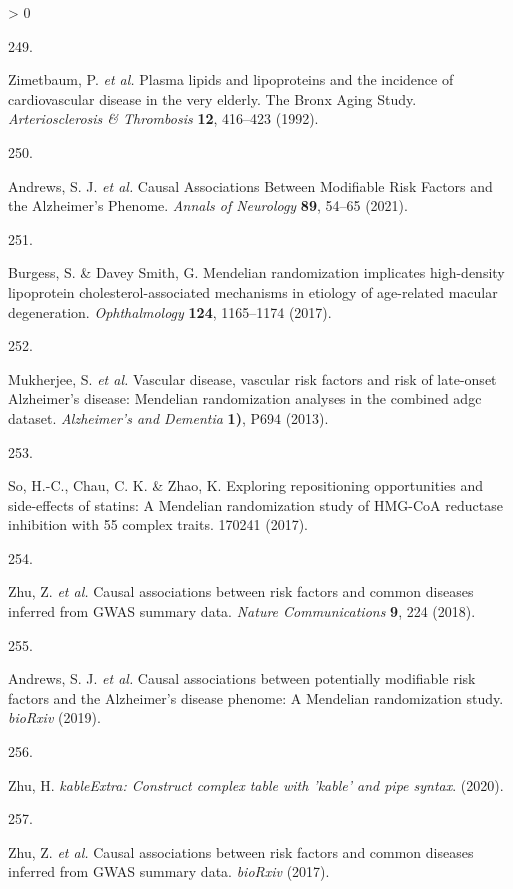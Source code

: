 \documentclass[a4paper, twoside]{templates/ociamthesis}
\newlength{\cslhangindent}
\newlength{\csllabelwidth}
\newenvironment{CSLReferences}[3] %
 {%
  \setlength{\parindent}{0pt}
  \ifodd #1 \everypar{\setlength{\hangindent}{\cslhangindent}}\ignorespaces\fi
  \ifnum #2 > 0
  \setlength{\parskip}{#2\baselineskip}
  \fi
 }%
 {}
\newcommand{\CSLLeftMargin}[1]{\parbox[t]{\maxof{\widthof{#1}}{\csllabelwidth}}{#1}}
\newcommand{\CSLRightInline}[1]{\parbox[t]{\linewidth - \csllabelwidth}{#1}}
\begin{document}
\begin{CSLReferences}{0}{0}
\leavevmode\hypertarget{ref-zimetbaum1992}{}%
\CSLLeftMargin{249. }
\CSLRightInline{Zimetbaum, P. \emph{et al.} Plasma lipids and lipoproteins and the incidence of cardiovascular disease in the very elderly. {The Bronx Aging Study}. \emph{Arteriosclerosis \& Thrombosis} \textbf{12}, 416--423 (1992).}

\leavevmode\hypertarget{ref-andrews2021}{}%
\CSLLeftMargin{250. }
\CSLRightInline{Andrews, S. J. \emph{et al.} Causal {Associations Between Modifiable Risk Factors} and the {Alzheimer}'s {Phenome}. \emph{Annals of Neurology} \textbf{89}, 54--65 (2021).}

\leavevmode\hypertarget{ref-burgess2017}{}%
\CSLLeftMargin{251. }
\CSLRightInline{Burgess, S. \& Davey Smith, G. Mendelian randomization implicates high-density lipoprotein cholesterol-associated mechanisms in etiology of age-related macular degeneration. \emph{Ophthalmology} \textbf{124}, 1165--1174 (2017).}

\leavevmode\hypertarget{ref-mukherjee2013}{}%
\CSLLeftMargin{252. }
\CSLRightInline{Mukherjee, S. \emph{et al.} Vascular disease, vascular risk factors and risk of late-onset {Alzheimer}'s disease: Mendelian randomization analyses in the combined adgc dataset. \emph{Alzheimer's and Dementia} \textbf{1)}, P694 (2013).}

\leavevmode\hypertarget{ref-so2017}{}%
\CSLLeftMargin{253. }
\CSLRightInline{So, H.-C., Chau, C. K. \& Zhao, K. Exploring repositioning opportunities and side-effects of statins: A {Mendelian} randomization study of {HMG}-{CoA} reductase inhibition with 55 complex traits. 170241 (2017).}

\leavevmode\hypertarget{ref-zhu2018}{}%
\CSLLeftMargin{254. }
\CSLRightInline{Zhu, Z. \emph{et al.} Causal associations between risk factors and common diseases inferred from {GWAS} summary data. \emph{Nature Communications} \textbf{9}, 224 (2018).}

\leavevmode\hypertarget{ref-andrews2019}{}%
\CSLLeftMargin{255. }
\CSLRightInline{Andrews, S. J. \emph{et al.} Causal associations between potentially modifiable risk factors and the {Alzheimer}'s disease phenome: A {Mendelian} randomization study. \emph{bioRxiv} (2019).}

\leavevmode\hypertarget{ref-zhu2020}{}%
\CSLLeftMargin{256. }
\CSLRightInline{Zhu, H. \emph{{kableExtra}: Construct complex table with 'kable' and pipe syntax}. (2020).}

\leavevmode\hypertarget{ref-zhu2017}{}%
\CSLLeftMargin{257. }
\CSLRightInline{Zhu, Z. \emph{et al.} Causal associations between risk factors and common diseases inferred from {GWAS} summary data. \emph{bioRxiv} (2017).}


\end{CSLReferences}
\end{document}
